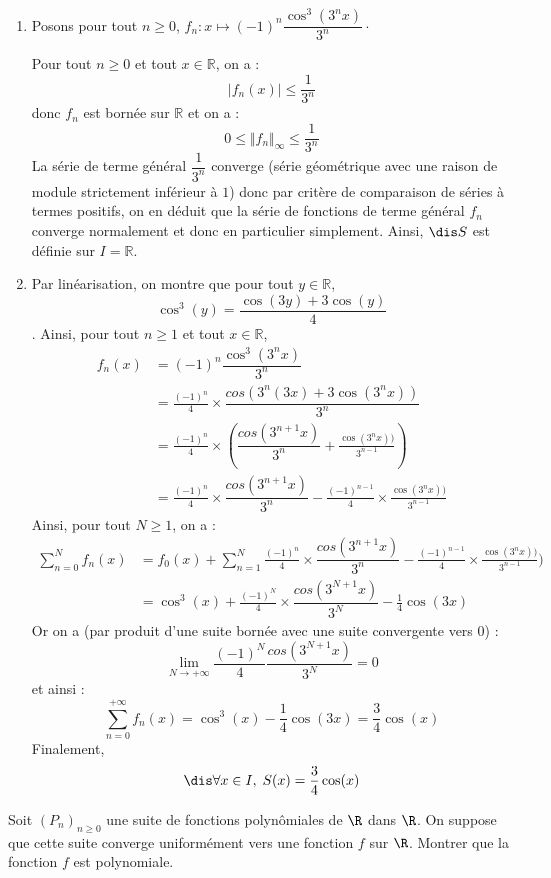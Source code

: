 \documentclass[a4paper,10pt]{report}
\begin{document}
\corr \begin{enumerate}
\item Posons pour tout $n \geq 0$, $f_n : x \mapsto (-1)^n \dfrac{\cos^3(3^nx)}{3^n} \cdot$

\medskip

\noindent Pour tout $n \geq 0$ et tout $x \in \mathbb{R}$, on a :
$$ \vert f_n(x) \vert \leq \frac{1}{3^n}$$
donc $f_n$ est bornée sur $\mathbb{R}$ et on a :
$$ 0 \leq \Vert f_n \Vert_{\infty} \leq \frac{1}{3^n}$$
La série de terme général $\dfrac{1}{3^n}$ converge (série géométrique avec une raison de module strictement inférieur à $1$) donc par critère de comparaison de séries à termes positifs, on en déduit que la série de fonctions de terme général $f_n$ converge normalement et donc en particulier simplement. Ainsi, $\dis S$ est définie sur $I = \mathbb{R}$.
\item Par linéarisation, on montre que pour tout $y \in \mathbb{R}$,
$$ \cos^3(y) = \frac{\cos(3y)+3\cos(y)}{4}$$.
Ainsi, pour tout $n \geq 1$ et tout $x \in \mathbb{R}$,
\begin{align*}
f_n(x)& = (-1)^n \dfrac{\cos^3(3^nx)}{3^n} \\
& = \frac{(-1)^n}{4} \times  \dfrac{cos(3^n(3x)+3\cos(3^nx))}{3^n}  \\
& = \frac{(-1)^n}{4} \times  \left(\dfrac{cos(3^{n+1} x)}{3^n}+\frac{\cos(3^nx))}{3^{n-1}} \right) \\
& = \frac{(-1)^n}{4} \times\dfrac{cos(3^{n+1} x)}{3^n}- \frac{(-1)^{n-1}}{4} \times\frac{\cos(3^nx))}{3^{n-1}} 
\end{align*}
Ainsi, pour tout $N \geq 1$, on a :
\begin{align*}
\sum_{n=0}^{N} f_n(x) & = f_0(x) + \sum_{n=1}^{N} \frac{(-1)^n}{4} \times\dfrac{cos(3^{n+1} x)}{3^n}- \frac{(-1)^{n-1}}{4} \times\frac{\cos(3^nx))}{3^{n-1}})  \\
& = \cos^3(x) + \frac{(-1)^N}{4} \times\dfrac{cos(3^{N+1} x)}{3^N} - \frac{1}{4} \cos(3x)     
\end{align*}
Or on a (par produit d'une suite bornée avec une suite convergente vers $0$) :
$$ \lim_{N \rightarrow + \infty} \frac{(-1)^N}{4} \dfrac{cos(3^{N+1} x)}{3^N} = 0$$
et ainsi :
$$ \sum_{n=0}^{+\infty} f_n(x)  = \cos^3(x) - \frac{1}{4} \cos(3x) = \frac{3}{4} \cos(x)$$
Finalement,
$$\dis \forall x \in I, \; S(x)= \dfrac{3}{4}\cos(x)$$
\end{enumerate}

\begin{Exa} Soit $(P_{n})_{n \geq 0}$ une suite de fonctions polynômiales de $\R$ dans $\R$. On suppose que cette suite converge uniformément vers une fonction $f$ sur $\R$. Montrer que la fonction $f$ est polynomiale.
\end{Exa}
\end{document}
